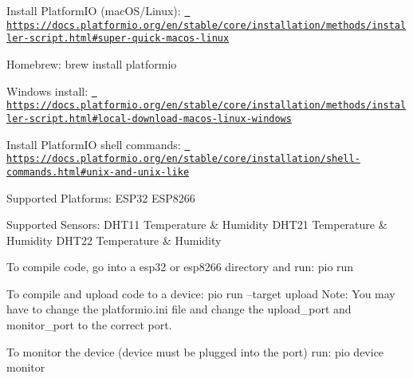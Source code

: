 Install Platform\+IO (mac\+OS/\+Linux)\+: \href{https://docs.platformio.org/en/stable/core/installation/methods/installer-script.html\#super-quick-macos-linux}{\texttt{ https\+://docs.\+platformio.\+org/en/stable/core/installation/methods/installer-\/script.\+html\#super-\/quick-\/macos-\/linux}}

Homebrew\+: brew install platformio

Windows install\+: \href{https://docs.platformio.org/en/stable/core/installation/methods/installer-script.html\#local-download-macos-linux-windows}{\texttt{ https\+://docs.\+platformio.\+org/en/stable/core/installation/methods/installer-\/script.\+html\#local-\/download-\/macos-\/linux-\/windows}}

Install Platform\+IO shell commands\+: \href{https://docs.platformio.org/en/stable/core/installation/shell-commands.html\#unix-and-unix-like}{\texttt{ https\+://docs.\+platformio.\+org/en/stable/core/installation/shell-\/commands.\+html\#unix-\/and-\/unix-\/like}}

Supported Platforms\+: ESP32 ESP8266

Supported Sensors\+: DHT11 Temperature \& Humidity DHT21 Temperature \& Humidity DHT22 Temperature \& Humidity

To compile code, go into a esp32 or esp8266 directory and run\+: pio run

To compile and upload code to a device\+: pio run --target upload Note\+: You may have to change the platformio.\+ini file and change the upload\+\_\+port and monitor\+\_\+port to the correct port.

To monitor the device (device must be plugged into the port) run\+: pio device monitor 